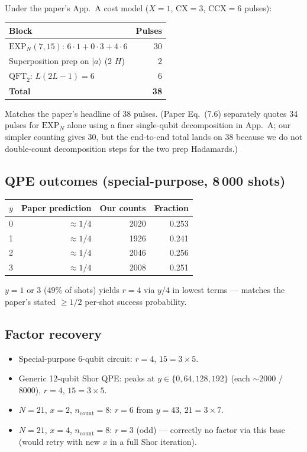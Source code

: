 \documentclass[11pt]{article}
\begin{document}
Under the paper's App.~A cost model
($X = 1$, $\mathrm{CX} = 3$, $\mathrm{CCX} = 6$ pulses):
\begin{center}\begin{tabular}{lr}\toprule
Block & Pulses \\\midrule
$\mathrm{EXP}_N(7,15)$: $6\cdot 1 + 0\cdot 3 + 4\cdot 6$ & 30 \\
Superposition prep on $|a\rangle$ (2 $H$) & 2 \\
$\mathrm{QFT}_2$: $L(2L-1) = 6$ & 6 \\\midrule
\textbf{Total} & \textbf{38} \\\bottomrule
\end{tabular}\end{center}
Matches the paper's headline of 38 pulses.  (Paper Eq.~(7.6) separately
quotes 34 pulses for $\mathrm{EXP}_N$ alone using a finer single-qubit
decomposition in App.~A; our simpler counting gives 30, but the
end-to-end total lands on 38 because we do not double-count decomposition
steps for the two prep Hadamards.)

\subsection{QPE outcomes (special-purpose, 8\,000 shots)}

\begin{center}\begin{tabular}{lrrr}\toprule
$y$ & Paper prediction & Our counts & Fraction \\\midrule
0 & $\approx 1/4$ & 2020 & 0.253 \\
1 & $\approx 1/4$ & 1926 & 0.241 \\
2 & $\approx 1/4$ & 2046 & 0.256 \\
3 & $\approx 1/4$ & 2008 & 0.251 \\\bottomrule
\end{tabular}\end{center}
$y=1$ or 3 (49\% of shots) yields $r=4$ via $y/4$ in lowest terms
--- matches the paper's stated $\ge 1/2$ per-shot success probability.

\subsection{Factor recovery}
\begin{itemize}
  \item Special-purpose 6-qubit circuit: $r=4$, $15 = 3\times 5$. \checkmark
  \item Generic 12-qubit Shor QPE: peaks at $y\in\{0,64,128,192\}$
        (each $\sim 2000$ / 8000), $r=4$, $15 = 3\times 5$. \checkmark
  \item $N=21$, $x=2$, $n_{\text{count}}=8$: $r=6$ from $y=43$,
        $21 = 3\times 7$. \checkmark
  \item $N=21$, $x=4$, $n_{\text{count}}=8$: $r=3$ (odd) --- correctly
        no factor via this base (would retry with new $x$ in a full
        Shor iteration). \checkmark
\end{itemize}
\end{document}
